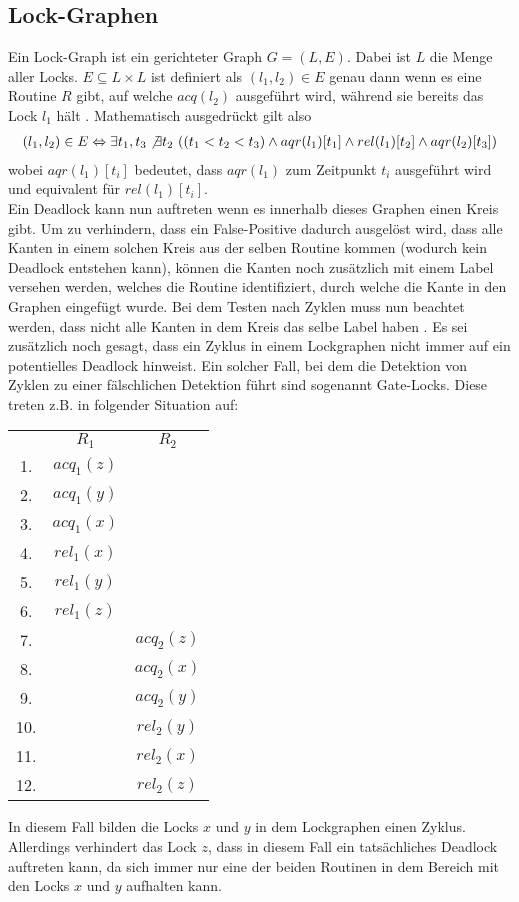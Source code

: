 \subsection{Lock-Graphen}
Ein Lock-Graph ist ein gerichteter Graph $G = (L, E)$. Dabei ist $L$ die Menge 
aller Locks. $E \subseteq L \times L$ ist definiert als $(l_1, l_2) \in E$ genau 
dann wenn es eine Routine $R$ gibt, auf welche $acq(l_2)$ ausgeführt wird, während sie 
bereits das Lock $l_1$ hält \cite{bensalem}. Mathematisch ausgedrückt gilt also 
\begin{align*}
    (l_1, l_2) \in E \Leftrightarrow \exists t_1, t_3 \not\exists t_2\ ((t_1 < t_2 < t_3) \land aqr(l_1)[t_1] \land rel(l_1)[t_2] \land  aqr(l_2)[t_3])
\end{align*}
wobei $aqr(l_1)[t_i]$ bedeutet, dass $aqr(l_1)$ zum Zeitpunkt $t_i$ ausgeführt 
wird und equivalent für $rel(l_1)[t_i]$.\\
Ein Deadlock kann nun auftreten wenn es innerhalb dieses Graphen einen Kreis 
gibt. Um zu verhindern, dass ein False-Positive dadurch ausgelöst wird, dass 
alle Kanten in einem solchen Kreis aus der selben Routine kommen (wodurch kein 
Deadlock entstehen kann), können die Kanten noch zusätzlich mit einem Label 
versehen werden, welches die Routine identifiziert, durch welche die Kante in 
den Graphen eingefügt wurde. Bei dem Testen nach Zyklen muss nun beachtet 
werden, dass nicht alle Kanten in dem Kreis das selbe Label haben 
\cite{bensalem}. Es sei zusätzlich noch gesagt, dass ein Zyklus in einem 
Lockgraphen nicht immer auf ein potentielles Deadlock hinweist. Ein solcher 
Fall, bei dem die Detektion von Zyklen zu einer fälschlichen Detektion 
führt sind sogenannt Gate-Locks. Diese treten z.B. in folgender Situation
auf:
\begin{table}[H]
     \centering
     \begin{tabular}{ccc}
        & $R_1$        & $R_2$          \\
     1. & $acq_{1}(z)$ &                \\
     2. & $acq_{1}(y)$ &                \\
     3. & $acq_{1}(x)$ &                \\
     4. & $rel_{1}(x)$ &                \\
     5. & $rel_{1}(y)$ &                \\
     6. & $rel_{1}(z)$ &                \\
     7. &              & $acq_{2}(z)$ \\
     8. &              & $acq_{2}(x)$ \\
     9. &              & $acq_{2}(y)$ \\
    10. &              & $rel_{2}(y)$ \\
    11. &              & $rel_{2}(x)$ \\
    12. &              & $rel_{2}(z)$
    \end{tabular}
\end{table}
In diesem Fall bilden die Locks $x$ und $y$ in dem Lockgraphen einen Zyklus. 
Allerdings verhindert das Lock $z$, dass in diesem Fall ein tatsächliches 
Deadlock auftreten kann, da sich immer nur eine der beiden Routinen 
in dem Bereich mit den Locks $x$ und $y$ aufhalten kann.
